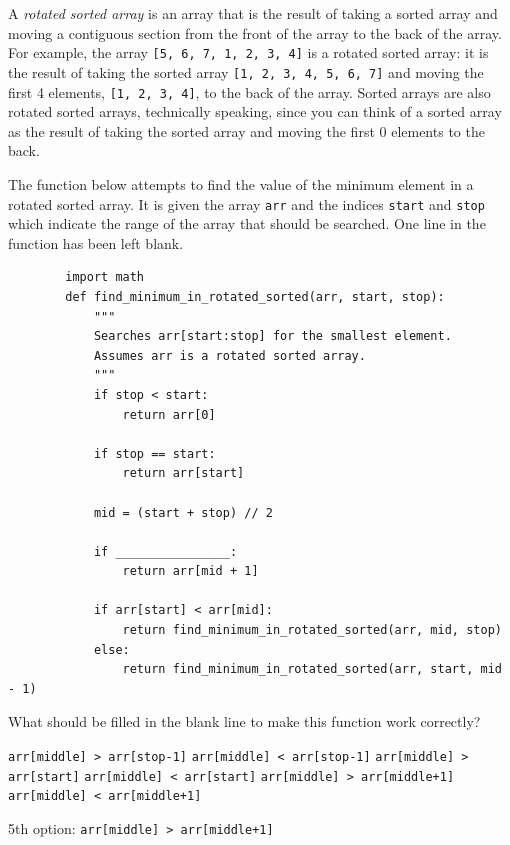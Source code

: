\begin{prob}
    A \emph{rotated sorted array} is an array that is the result of taking a sorted array
    and moving a contiguous section from the front of the array to the back of the array.
    For example, the array \texttt{[5, 6, 7, 1, 2, 3, 4]} is a rotated sorted array: it
    is the result of taking the sorted array \texttt{[1, 2, 3, 4, 5, 6, 7]} and moving
    the first 4 elements, \texttt{[1, 2, 3, 4]}, to the back of the array. Sorted
    arrays are also rotated sorted arrays, technically speaking, since you can
    think of a sorted array as the result of taking the sorted array and moving
    the first 0 elements to the back.

    The function below attempts to find the value of the minimum element in a
    rotated sorted array. It is given the array \texttt{arr} and the indices
    \texttt{start} and \texttt{stop} which indicate the range of the array that
    should be searched. One line in the function has been left blank.


    \begin{verbatim}
        import math
        def find_minimum_in_rotated_sorted(arr, start, stop):
            """
            Searches arr[start:stop] for the smallest element.
            Assumes arr is a rotated sorted array.
            """
            if stop < start:
                return arr[0]

            if stop == start:
                return arr[start]

            mid = (start + stop) // 2

            if ________________:
                return arr[mid + 1]

            if arr[start] < arr[mid]:
                return find_minimum_in_rotated_sorted(arr, mid, stop)
            else:
                return find_minimum_in_rotated_sorted(arr, start, mid - 1)
    \end{verbatim}

    What should be filled in the blank line to make this function work correctly?

    \begin{choices}
        \choice \texttt{arr[middle] > arr[stop-1]}
        \choice \texttt{arr[middle] < arr[stop-1]}
        \choice \texttt{arr[middle] > arr[start]}
        \choice \texttt{arr[middle] < arr[start]}
        \correctchoice \texttt{arr[middle] > arr[middle+1]}
        \choice \texttt{arr[middle] < arr[middle+1]}
    \end{choices}

    \begin{soln}
        5th option: \texttt{arr[middle] > arr[middle+1]}
    \end{soln}

\end{prob}

